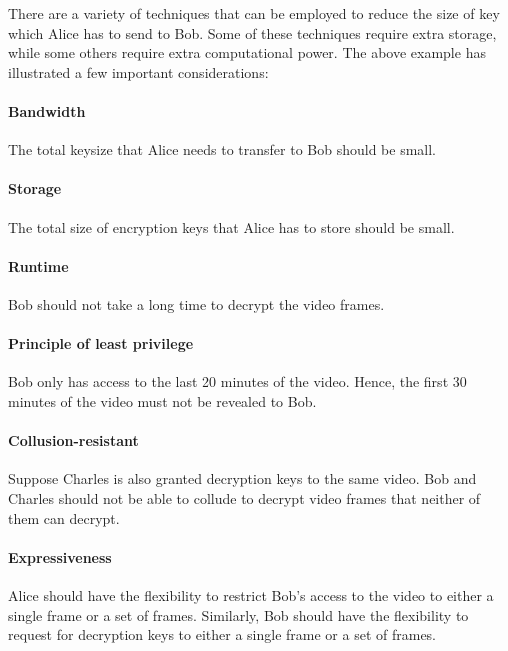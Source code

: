 \documentclass[hyp,a4paper,12pt,openbib]{socreport}
\begin{document}

There are a variety of techniques that can be employed to reduce the size of key which Alice has to send to Bob. Some of these techniques require extra storage, while some others require extra computational power. The above example has illustrated a few important considerations:

\paragraph{Bandwidth} The total keysize that Alice needs to transfer to Bob should be small.
\paragraph{Storage} The total size of encryption keys that Alice has to store should be small. 
\paragraph{Runtime} Bob should not take a long time to decrypt the video frames.
\paragraph{Principle of least privilege} Bob only has access to the last 20 minutes of the video. Hence, the first 30 minutes of the video must not be revealed to Bob.
\paragraph{Collusion-resistant} Suppose Charles is also granted decryption keys to the same video. Bob and Charles should not be able to collude to decrypt video frames that neither of them can decrypt.
\paragraph{Expressiveness} Alice should have the flexibility to restrict Bob's access to the video to either a single frame or a set of frames. Similarly, Bob should have the flexibility to request for decryption keys to either a single frame or a set of frames. 
\end{document}
